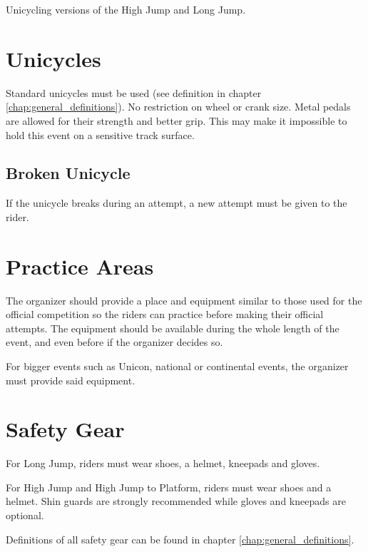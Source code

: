 
Unicycling versions of the High Jump and Long Jump.

\section{Unicycles}
Standard unicycles must be used (see definition in chapter \ref{chap:general_definitions}).
No restriction on wheel or crank size.
Metal pedals are allowed for their strength and better grip.
This may make it impossible to hold this event on a sensitive track surface.

\subsection{Broken Unicycle}
If the unicycle breaks during an attempt, a new attempt must be given to the rider.

\section{Practice Areas}
The organizer should provide a place and equipment similar to those used for the official competition so the riders can practice before making their official attempts.
The equipment should be available during the whole length of the event, and even before if the organizer decides so.

For bigger events such as Unicon, national or continental events, the organizer must provide said equipment.

\section{Safety Gear}
For Long Jump, riders must wear shoes, a helmet, kneepads and gloves.

For High Jump and High Jump to Platform, riders must wear shoes and a helmet.
Shin guards are strongly recommended while gloves and kneepads are optional.

Definitions of all safety gear can be found in chapter \ref{chap:general_definitions}.

